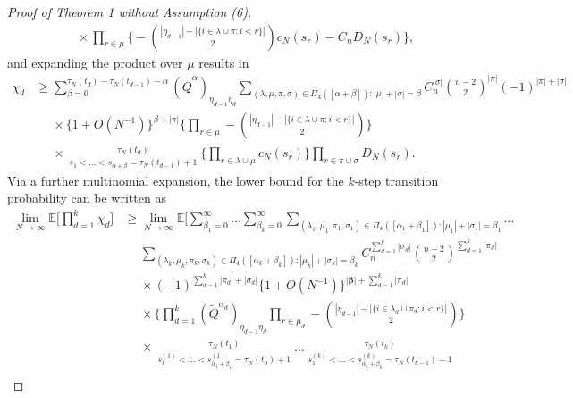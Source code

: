 \documentclass[a4paper,11pt]{article}
\theoremstyle{definition}
\newcommand{\E}{\mathbb{E}}
\newcommand{\1}{\mathds{1}}
\newcommand{\osum}{\mathop{\sum\nolimits^{\phantom{}_{\star}}}\limits}
\begin{document}
\begin{proof}[Proof of Theorem 1 without Assumption (6)]
\begin{align*}
&\phantom{\geq} \times \prod_{ r \in \mu } \Bigg\{ - \binom{ | \eta_{ d - 1 } | - | \{ i \in \lambda \cup \pi : i < r \} | }{ 2 } c_N( s_r ) - C_n D_N( s_r ) \Bigg\},
\end{align*}
and expanding the product over $\mu$ results in
\begin{align*}
\chi_d &\geq \sum_{ \beta = 0 }^{ \tau_N( t_d ) - \tau_N( t_{ d - 1 } ) - \alpha } ( \tilde{ Q }^{ \alpha } )_{ \eta_{ d - 1 } \eta_d } \sum_{ ( \lambda, \mu, \pi, \sigma ) \in \Pi_4( [ \alpha + \beta ] ) : | \mu | + | \sigma | = \beta } C_n^{ | \sigma | } \binom{ n - 2 }{ 2 }^{ | \pi | } ( -1 )^{ | \pi | + | \sigma | } \\
&\phantom{\geq} \times \{ 1 + O( N^{ -1 } ) \}^{ \beta + | \pi | } \Bigg\{ \prod_{ r \in \mu } - \binom{ | \eta_{ d - 1 } | - | \{ i \in \lambda \cup \pi : i < r \} | }{ 2 } \Bigg\} \\
&\phantom{\geq} \times \osum_{ s_1 < \ldots < s_{ \alpha + \beta } = \tau_N( t_{ d - 1 } ) + 1 }^{ \tau_N( t_d ) } \Bigg\{ \prod_{ r \in \lambda \cup \mu } c_N( s_r ) \Bigg\} \prod_{ r \in \pi \cup \sigma }  D_N( s_r ) .
\end{align*}
Via a further multinomial expansion, the lower bound for the $k$-step transition probability can be written as
\begin{align*}
\lim_{ N \rightarrow \infty } \E\Bigg[ \prod_{ d = 1 }^k \chi_d \Bigg] &\geq \lim_{ N \rightarrow \infty } \E\Bigg[ \sum_{ \beta_1 = 0 }^{ \infty } \ldots \sum_{ \beta_k = 0 }^{ \infty } \sum_{ ( \lambda_1, \mu_1, \pi_1, \sigma_1 ) \in \Pi_4( [ \alpha_1 + \beta_1 ] ) : | \mu_1 | + | \sigma_1 | = \beta_1 } \ldots \\
&\phantom{\geq} \sum_{ ( \lambda_k, \mu_k, \pi_k, \sigma_k ) \in \Pi_4( [ \alpha_k + \beta_k ] ) : | \mu_k | + | \sigma_k | = \beta_k } C_n^{ \sum_{ d = 1 }^k | \sigma_d | } \binom{ n - 2 }{ 2 }^{ \sum_{ d = 1 }^k| \pi_d | } \\
&\phantom{\geq} \times ( -1 )^{ \sum_{ d = 1 }^k | \pi_d | + | \sigma_d | }  \{ 1 + O( N^{ -1 } ) \}^{ | \bm{ \beta } | + \sum_{ d = 1 }^k | \pi_d | } \\
&\phantom{\geq} \times \Bigg\{ \prod_{ d = 1 }^k ( \tilde{ Q }^{ \alpha_d } )_{ \eta_{ d - 1 } \eta_d } \prod_{ r \in \mu_d } - \binom{ | \eta_{ d - 1 } | - | \{ i \in \lambda_d \cup \pi_d : i < r \} | }{ 2 } \Bigg\} \\
&\phantom{\geq} \times \osum_{ s_1^{ ( 1 ) } < \ldots < s_{ \alpha_1 + \beta_1 }^{ ( 1 ) } = \tau_N( t_0 ) + 1 }^{ \tau_N( t_1 ) } \ldots \osum_{ s_1^{ ( k ) } < \ldots < s_{ \alpha_k + \beta_k }^{ ( k ) } = \tau_N( t_{ k - 1 } ) + 1 }^{ \tau_N( t_k ) } \\

\end{align*}
\end{proof}
\end{document}
